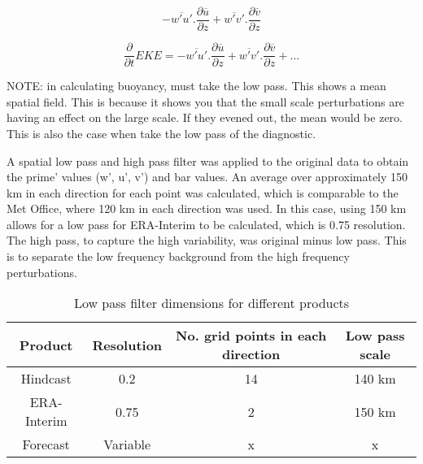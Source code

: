 \begin{equation} \label{eq_diag1}
-\overline{w'u'} . \frac{\partial{\overline u}}{\partial z} + \overline{w'v'} . \frac{\partial{\overline v}}{\partial z}
\end{equation}

\begin{equation} \label{eq_diag2}
\frac{\partial}{\partial{t}} EKE = -\overline{w'u'} . \frac{\partial{\overline u}}{\partial z} + \overline{w'v'} . \frac{\partial{\overline v}}{\partial z} + ...
\end{equation}

NOTE: in calculating buoyancy, must take the low pass. This shows a mean spatial field. This is because it shows you that the small scale perturbations are having an effect on the large scale. If they evened out, the mean would be zero. This is also the case when take the low pass of the diagnostic.


A spatial low pass and high pass filter was applied to the original data to obtain the prime' values (w', u', v') and bar values. An average over approximately 150 km in each direction for each point was calculated, which is comparable to the Met Office, where 120 km in each direction was used. In this case, using 150 km allows for a low pass for ERA-Interim to be calculated, which is 0.75 resolution. The high pass, to capture the high variability, was original minus low pass. This is to separate the low frequency background from the high frequency perturbations.


\begin{table}[h]
	\caption{Low pass filter dimensions for different products}\label{t_lowpass}
	\begin{center}
		\begin{tabular}{cccc}
			\hline\hline
			Product & Resolution & No. grid points in each direction & Low pass scale \\
			\hline
			Hindcast & 0.2 & 14 & 140 km \\ 
			ERA-Interim & 0.75  & 2 & 150 km \\
			Forecast & Variable &  x & x \\			
			
			\hline
		\end{tabular}
	\end{center}
\end{table}


